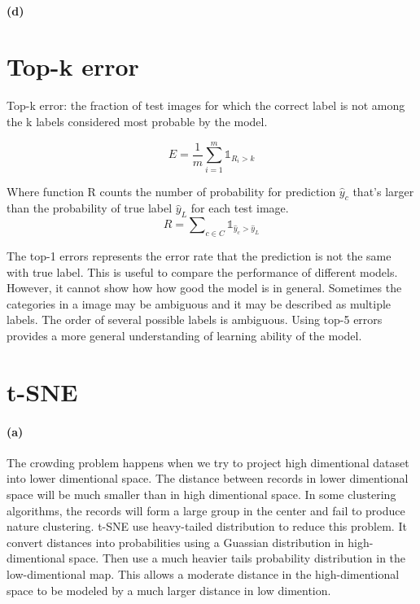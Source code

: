 \documentclass{article}
\begin{document}
\paragraph{(d)}

\section{Top-k error}
Top-k error: the fraction of test images for which the correct label is not among the k labels considered most probable by the model.

\begin{equation}
E = {\frac{1}{m} \sum\limits_{i=1}^{m} \mathds{1}_{R_i > k} } 
\end{equation}

Where function R counts the number of probability for prediction $\hat y_c$ that's larger than the probability of true label $\hat y_L$ for each test image.
\begin{equation}
R = \sum\nolimits_{c \in C} \mathds{1}_{ \hat y_c > \hat y_L }
\end{equation}

The top-1 errors represents the error rate that the prediction is not the same with true label. 
This is useful to compare the performance of different models. However, it cannot show how how good the model is in general.
Sometimes the categories in a image may be ambiguous and it may be described as multiple labels. The order of several possible labels is ambiguous.
Using top-5 errors provides a more general understanding of learning ability of the model. 

\section{t-SNE}
\paragraph{(a)}
The crowding problem happens when we try to project high dimentional dataset into lower dimentional space. 
The distance between records in lower dimentional space will be much smaller than in high dimentional space.
In some clustering algorithms, the records will form a large group in the center and fail to produce nature clustering.
t-SNE use heavy-tailed distribution to reduce this problem. 
It convert distances into probabilities using a Guassian distribution in high-dimentional space.
Then use a much heavier tails probability distribution in the low-dimentional map.
This allows a moderate distance in the high-dimentional space to be modeled by a much larger distance in low dimention.
\end{document}

